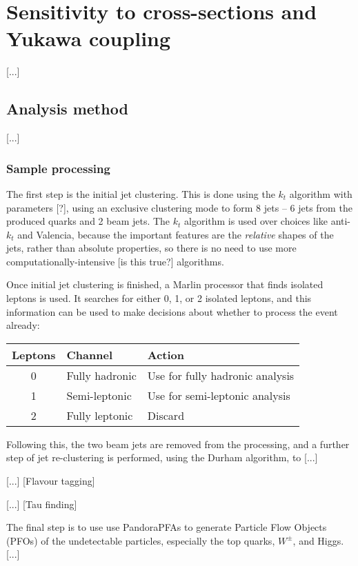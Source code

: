 \section{Sensitivity to cross-sections and Yukawa coupling}
[...]

\subsection{Analysis method}
[...]

\subsubsection{Sample processing}

The first step is the initial jet clustering. This is done using the $k_t$ algorithm with parameters [?], using an exclusive clustering mode to form 8 jets -- 6 jets from the produced quarks and 2 beam jets. The $k_t$ algorithm is used over choices like anti-$k_t$ and Valencia, because the important features are the \emph{relative} shapes of the jets, rather than absolute properties, so there is no need to use more computationally-intensive [is this true?] algorithms.

Once initial jet clustering is finished, a Marlin processor that finds isolated leptons is used. It searches for either 0, 1, or 2 isolated leptons, and this information can be used to make decisions about whether to process the event already:

\begin{table}[htp]
\centering
	\begin{tabular}{ | c | l | l | }
	\hline
	Leptons & Channel & Action \\ \hline
	0 & Fully hadronic & Use for fully hadronic analysis \\ \hline
	1 & Semi-leptonic & Use for semi-leptonic analysis \\ \hline
	2 & Fully leptonic & Discard \\ \hline
	\end{tabular}
\end{table}

Following this, the two beam jets are removed from the processing, and a further step of jet re-clustering is performed, using the Durham algorithm, to [...] %

[...] [Flavour tagging]

[...] [Tau finding]

The final step is to use use PandoraPFAs to generate Particle Flow Objects (PFOs) of the undetectable particles, especially the top quarks, $W^\pm$, and Higgs. [...]


